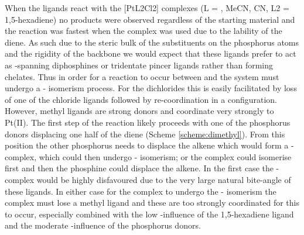 When the \tBuxantphos{} ligands react with the [PtL2Cl2] complexes (L = , MeCN, \tBu CN, L2 = 1,5-hexadiene) no \cis{} products were observed regardless of the starting material and the reaction was fastest when the \cis{} complex \ce{[Pt(hex)Cl2]} was used due to the lability of the diene.  As such due to the steric bulk of the \tBu{} substituents on the phosphorus atoms and the rigidity of the \tBuxantphos{} backbone we would expect that these ligands prefer to act as \trans{}-spanning diphosphines or tridentate \POP{} pincer ligands rather than forming \cis{} chelates.  Thus in order for a reaction to occur between \tBuxantphos{} and \ce{[Pt(hex)Me2]} the system must undergo a \cis-\trans{} isomerism process.  For the dichlorides this is easily facilitated by loss of one of the chloride ligands followed by re-coordination in a \trans{} configuration.  However, methyl ligands are strong  donors and coordinate very strongly to Pt(II).  The first step of the reaction likely proceeds with one of the phosphorus donors displacing one half of the diene (Scheme \ref{scheme:dimethyl}).   From this position the other phosphorus needs to displace the alkene which would form a \cis{}-\tBuxantphos{} complex, which could then undergo \cis-\trans{} isomerism; or the complex could isomerise first and then the phosphine could displace the alkene.  In the first case the \cis-\tBuxantphos{} complex would be highly disfavoured due to the very large natural bite-angle of these ligands.  In either case for the complex to undergo the \cis-\trans{} isomerism the complex must lose a methyl ligand and these are too strongly coordinated for this to occur, especially combined with the low \trans{}-influence of the 1,5-hexadiene ligand and the moderate \trans{}-influence of the phosphorus donors.   


